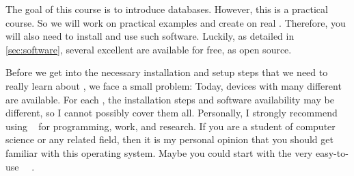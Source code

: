 %
%
%
The goal of this course is to introduce databases.
However, this is a practical course.
So we will work on practical examples and create   on real .
Therefore, you will also need to install and use such software.
Luckily, as detailed in \cref{sec:software}, several excellent  are available for free, as open source.

Before we get into the necessary installation and setup steps that we need to really learn about , we face a small problem:
Today, devices with many different  are available.
For each , the installation steps and software availability may be different, so I cannot possibly cover them all.
Personally, I strongly recommend using \linux~\cite{T1999TLE,B2022ELATCL,H2022LML} for programming, work, and research.
If you are a student of computer science or any related field, then it is my personal opinion that you should get familiar with this operating system.
Maybe you could start with the very easy-to-use \ubuntu\ \linux~\cite{CN2020ULB,H2020ULU2E}.
%
%
%
\endhsection%
%

